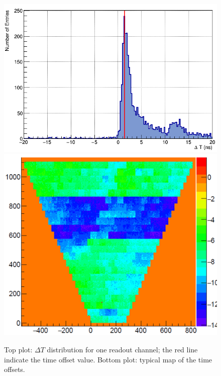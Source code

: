 \documentclass[5p,times,twocolumn]{elsarticle}
\begin{document}
\begin{figure}[t]
\begin{center}
\includegraphics[width=0.9\columnwidth]{Toffset_ch2913.png}
\includegraphics[width=0.9\columnwidth]{ToffsetMap.png}
\end{center}
\caption{Top plot: $\Delta T$ distribution for one readout channel; the red line indicate the time offset value. Bottom plot: typical map of the time offsets.}
\label{fig:Toffset}
\end{figure}
\end{document}
